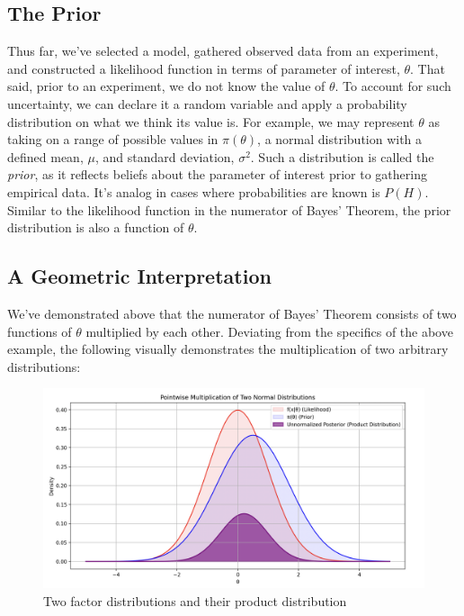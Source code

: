\documentclass[12pt]{article}
\begin{document}
\subsection*{The Prior}
\noindent Thus far, we've selected a model, gathered observed data from an experiment, and constructed a likelihood function in terms of parameter of interest, $\theta$. That said, prior to an experiment, we do not know the value of $\theta$. To account for such uncertainty, we can declare it a random variable and apply a probability distribution on what we think its value is. For example, we may represent $\theta$ as taking on a range of possible values in $\pi(\theta)$, a normal distribution with a defined mean, $\mu$, and standard deviation, $\sigma^2$. Such a distribution is called the \textit{prior}, as it reflects beliefs about the parameter of interest prior to gathering empirical data. It's analog in cases where probabilities are known is $P(H)$. Similar to the likelihood function in the numerator of Bayes' Theorem, the prior distribution is also a function of $\theta$.

\subsection*{A Geometric Interpretation}
\noindent We've demonstrated above that the numerator of Bayes' Theorem consists of two functions of $\theta$ multiplied by each other. Deviating from the specifics of the above example, the following visually demonstrates the multiplication of two arbitrary distributions:

\begin{figure}[h!]
\centering
\includegraphics[width=1.0\textwidth]{assets/visual_8.png} 
\caption{Two factor distributions and their product distribution}
\label{fig:cond_prob}
\end{figure}
\end{document}
